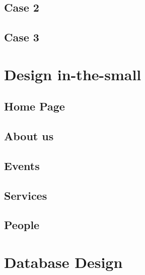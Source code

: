 \documentclass[11pt, a4paperm, hidelinks]{article}
\begin{document}
	\subsection{Case 2}
	
\clearpage

	\subsection{Case 3}
	
	\clearpage


	\section{Design in-the-small}

	\subsection{Home Page}
	
	\clearpage

	\subsection{About us}
	
	\clearpage

	\subsection{Events}
	
	\clearpage

	\subsection{Services}
	
	\clearpage

	\subsection{People}
	
	\clearpage

	\section{Database Design}	
	
	\clearpage
\end{document}
